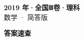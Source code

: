 \documentclass[zihao=-4, a4paper]{ctexart}
\begin{document}
\begin{center}
  {\Large\bfseries 2019 年·全国Ⅲ卷·理科}\\[4pt]
  {\large 数学 · 简答版}
\end{center}
\medskip
{}

\clearpage
{}
\begin{center}{\Large\bfseries 答案速查}\end{center}
\medskip

\end{document}
